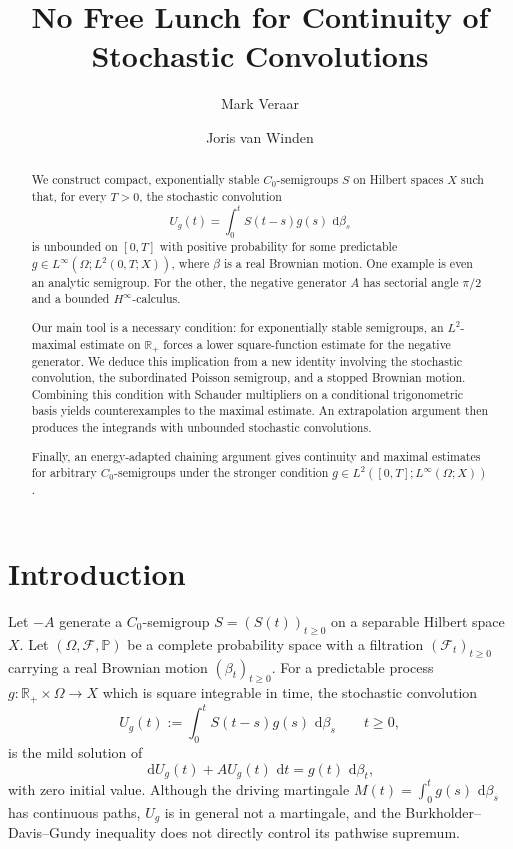 \documentclass[11pt]{amsart}
\title[Continuity of Stochastic Convolutions]{No Free Lunch for Continuity of Stochastic Convolutions}
\author{Mark Veraar}
\author{Joris van Winden}
\theoremstyle{definition}
\theoremstyle{remark}
\numberwithin{equation}{section}
\newcommand{\F}{\mathscr F}
\renewcommand{\P}{\mathbb P}
\newcommand{\R}{\mathbb R}
\newcommand{\1}{\mathbf 1}
\newcommand{\dd}{\,\mathrm d}
\begin{document}
\begin{abstract}
We construct compact, exponentially stable $C_0$-semigroups $S$
on Hilbert spaces $X$ such that, for every $T>0$, the stochastic
convolution
\[
    U_g(t)=\int_0^t S(t-s)g(s)\,\dd\beta_s
\]
is unbounded on $[0,T]$ with positive probability for some predictable
$g\in L^\infty(\Omega;L^2(0,T;X))$, where $\beta$ is a real Brownian
motion. One example is even an analytic semigroup. For the other, the negative generator
$A$ has sectorial angle $\pi/2$ and a bounded
$H^\infty$-calculus.

Our main tool is a necessary condition: for exponentially stable
semigroups, an $L^2$-maximal estimate on $\mathbb R_+$ forces a lower
square-function estimate for the negative generator.
We deduce this implication from a new identity involving the
stochastic convolution, the subordinated Poisson semigroup, and
a stopped Brownian motion.
Combining this condition with Schauder multipliers on a conditional
trigonometric basis yields counterexamples to the maximal estimate.
An extrapolation argument then produces the integrands with
unbounded stochastic convolutions.

Finally, an energy-adapted chaining argument gives continuity and
maximal estimates for arbitrary $C_0$-semigroups under the stronger
condition $g\in L^2([0,T]; L^\infty(\Omega;X))$.
\end{abstract}


\maketitle

\section{Introduction}
\label{sec:introduction}
Let \(-A\) generate a $C_0$-semigroup
\(S=(S(t))_{t\geq 0}\) on a separable Hilbert space \(X\).  Let  
\((\Omega,\F,\P)\) be a complete probability space with a filtration $(\F_t)_{t\geq 0}$ carrying a real
Brownian motion \((\beta_t)_{t \geq 0}\).  For a predictable process \(g : \R_+ \times \Omega \to X\) which is square
integrable in time,  the stochastic convolution
\begin{equation}
 U_g(t):=\int_0^t S(t-s)g(s)\,\dd\beta_s
 \qquad t\geq0,
 \label{eq:mild-solution}
\end{equation}
is the mild solution of
\begin{equation}
 \dd U_g(t)+AU_g(t)\,\dd t=g(t)\,\dd\beta_t,
 \label{eq:stochastic-equation}
\end{equation}
with zero initial value.  Although the driving martingale
\(M(t)=\int_0^t g(s)\,\dd\beta_s\) has continuous paths, \(U_g\) is in
general not a martingale, and the Burkholder--Davis--Gundy inequality does
not directly control its pathwise supremum.
\end{document}
